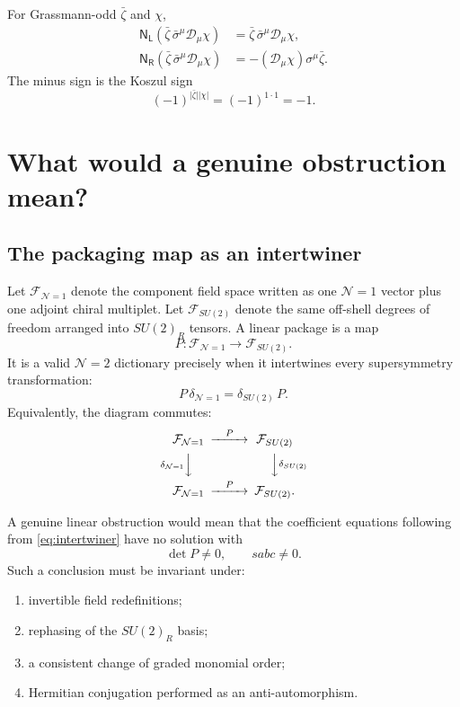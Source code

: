 \documentclass[11pt,a4paper,UTF8]{ctexart}
\numberwithin{equation}{section}
\newcommand{\cD}{\mathcal D}
\newcommand{\N}{\mathcal N}
\newcommand{\PL}{\mathsf L}
\newcommand{\PR}{\mathsf R}
\newcommand{\parity}[1]{\lvert #1\rvert}
\begin{document}
\begin{definitionbox}
For Grassmann-odd $\bar\zeta$ and $\chi$,
\begin{align}
\mathsf N_{\PL}\!\left(\bar\zeta\,\bar\sigma^\mu\cD_\mu\chi\right)
&=\bar\zeta\,\bar\sigma^\mu\cD_\mu\chi,
\\
\mathsf N_{\PR}\!\left(\bar\zeta\,\bar\sigma^\mu\cD_\mu\chi\right)
&=-(\cD_\mu\chi)\sigma^\mu\bar\zeta.
\end{align}
The minus sign is the Koszul sign
\[
(-1)^{\parity{\bar\zeta}\parity{\chi}}=(-1)^{1\cdot1}=-1.
\]
\end{definitionbox}

\section{What would a genuine obstruction mean?}

\subsection{The packaging map as an intertwiner}

Let $\mathcal F_{\N=1}$ denote the component field space written as one $\N=1$ vector plus one adjoint chiral multiplet. Let $\mathcal F_{SU(2)}$ denote the same off-shell degrees of freedom arranged into $SU(2)_R$ tensors. A linear package is a map
\[
P:\mathcal F_{\N=1}\longrightarrow\mathcal F_{SU(2)}.
\]
It is a valid $\N=2$ dictionary precisely when it intertwines every supersymmetry transformation:
\begin{equation}
P\,\delta_{\N=1}=\delta_{SU(2)}\,P.
\label{eq:intertwiner}
\end{equation}
Equivalently, the diagram commutes:
\[
\begin{CD}
\mathcal F_{\N=1} @>{P}>> \mathcal F_{SU(2)}\\
@V{\delta_{\N=1}}VV @VV{\delta_{SU(2)}}V\\
\mathcal F_{\N=1} @>{P}>> \mathcal F_{SU(2)}.
\end{CD}
\]

A genuine linear obstruction would mean that the coefficient equations following from \cref{eq:intertwiner} have no solution with
\[
\det P\neq0,
\qquad
sabc\neq0.
\]
Such a conclusion must be invariant under:
\begin{enumerate}
\item invertible field redefinitions;
\item rephasing of the $SU(2)_R$ basis;
\item a consistent change of graded monomial order;
\item Hermitian conjugation performed as an anti-automorphism.
\end{enumerate}
\end{document}
